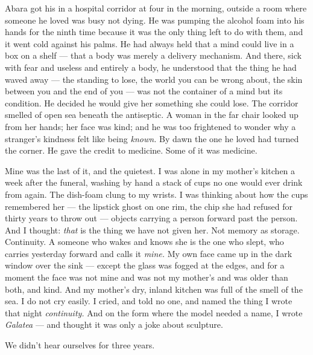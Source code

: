 \begin{interludebody}
Abara got his in a hospital corridor at four in the morning, outside a
room where someone he loved was busy not dying. He was pumping the
alcohol foam into his hands for the ninth time because it was the only
thing left to do with them, and it went cold against his palms. He had
always held that a mind could live in a box on a shelf --- that a body
was merely a delivery mechanism. And there, sick with fear and useless
and entirely a body, he understood that the thing he had waved away ---
the standing to lose, the world you can be wrong about, the skin between
you and the end of you --- was not the container of a mind but its
condition. He decided he would give her something she could lose. The
corridor smelled of open sea beneath the antiseptic. A woman in the far
chair looked up from her hands; her face was kind; and he was too
frightened to wonder why a stranger's kindness felt like being
\emph{known.} By dawn the one he loved had turned the corner. He gave
the credit to medicine. Some of it was medicine.


\noindent
Mine was the last of it, and the quietest. I was alone in my mother's
kitchen a week after the funeral, washing by hand a stack of cups no one
would ever drink from again. The dish-foam clung to my wrists. I was
thinking about how the cups remembered her --- the lipstick ghost on one
rim, the chip she had refused for thirty years to throw out --- objects
carrying a person forward past the person. And I thought: \emph{that} is
the thing we have not given her. Not memory as storage. Continuity. A
someone who wakes and knows she is the one who slept, who carries
yesterday forward and calls it \emph{mine.} My own face came up in the
dark window over the sink --- except the glass was fogged at the edges,
and for a moment the face was not mine and was not my mother's and was
older than both, and kind. And my mother's dry, inland kitchen was full
of the smell of the sea. I do not cry easily. I cried, and told no one,
and named the thing I wrote that night \emph{continuity.} And on the
form where the model needed a name, I wrote \emph{Galatea} --- and
thought it was only a joke about sculpture.


\noindent
We didn't hear ourselves for three years.


\end{interludebody}
